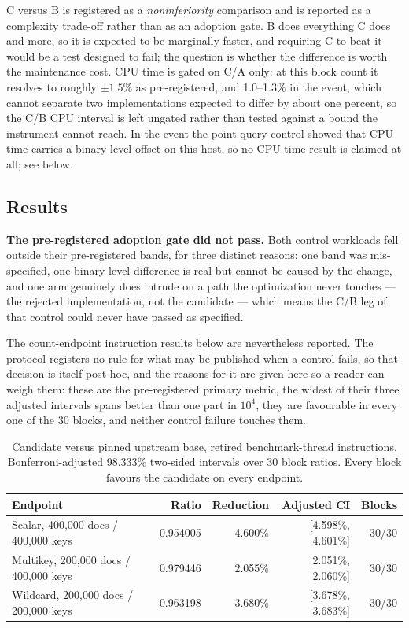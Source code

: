 \documentclass[10pt]{article}
\newcommand{\hdr}{\rowcolor{hdrgray}}
\newenvironment{ctab}{\par\smallskip\centering\small
  \setlength{\tabcolsep}{5pt}\renewcommand{\arraystretch}{1.12}}{\par\smallskip}
\begin{document}
C versus B is registered as a \emph{noninferiority} comparison and is reported
as a complexity trade-off rather than as an adoption gate. B does everything C
does and more, so it is expected to be marginally faster, and requiring C to
beat it would be a test designed to fail; the question is whether the difference
is worth the maintenance cost. CPU time is gated on C/A only: at this block
count it resolves to roughly $\pm1.5\%$ as pre-registered, and 1.0--1.3\% in
the event, which cannot separate two
implementations expected to differ by about one percent, so the C/B CPU interval
is left ungated rather than tested against a bound the instrument cannot reach.
In the event the point-query control showed that CPU time carries a
binary-level offset on this host, so no CPU-time result is claimed at all; see
below.

\subsection{Results}

\textbf{The pre-registered adoption gate did not pass.} Both control workloads
fell outside their pre-registered bands, for three distinct reasons: one band was
mis-specified, one binary-level difference is real but cannot be caused by the
change, and one arm genuinely does intrude on a path the optimization never
touches --- the rejected implementation, not the candidate --- which means the
C/B leg of that control could never have passed as specified.

The count-endpoint instruction results below are nevertheless reported. The
protocol registers no rule for what may be published when a control fails, so
that decision is itself post-hoc, and the reasons for it are given here so a
reader can weigh them: these are the pre-registered primary metric, the widest of
their three adjusted intervals spans better than one part in $10^4$, they are
favourable in every one of the 30 blocks, and neither control failure touches
them.

\begin{table}[H]
\caption{Candidate versus pinned upstream base, retired benchmark-thread
instructions. Bonferroni-adjusted 98.333\% two-sided intervals over 30 block
ratios. Every block favours the candidate on every endpoint.}
\label{tab:countscan-ca}
\begin{ctab}
\setlength{\tabcolsep}{6pt}
\begin{tabular}{@{}lrrrr@{}}
\toprule
\hdr Endpoint & Ratio & Reduction & Adjusted CI & Blocks \\
\midrule
Scalar, 400{,}000 docs / 400{,}000 keys    & 0.954005 & 4.600\% & [4.598\%, 4.601\%] & 30/30 \\
Multikey, 200{,}000 docs / 400{,}000 keys  & 0.979446 & 2.055\% & [2.051\%, 2.060\%] & 30/30 \\
Wildcard, 200{,}000 docs / 200{,}000 keys  & 0.963198 & 3.680\% & [3.678\%, 3.683\%] & 30/30 \\
\bottomrule
\end{tabular}
\end{ctab}
\end{table}
\end{document}
